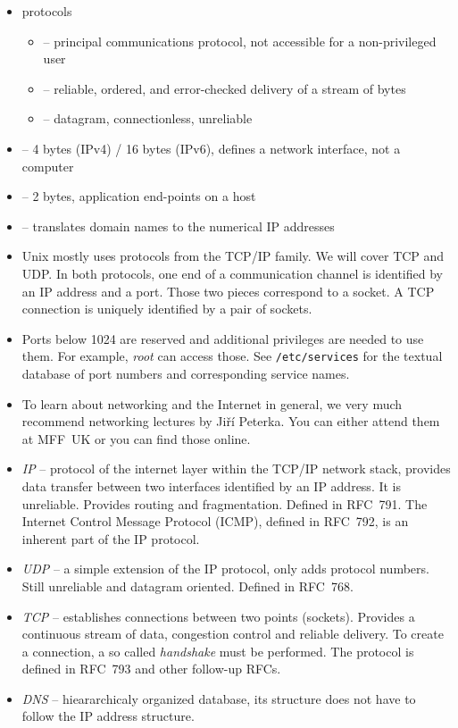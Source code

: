 
\begin{slide}
\begin{itemize}
\item protocols
    \begin{itemize}
    \item {} -- principal communications protocol,
    not accessible for a non-privileged user
    \item {} -- reliable, ordered, and
    error-checked delivery of a stream of bytes
    \item {} -- datagram, connectionless,
    unreliable
    \end{itemize}
\item {} -- 4 bytes (IPv4) / 16 bytes (IPv6), defines a network
interface, not a computer
\item {} -- 2 bytes, application end-points on a host
\item {} --  translates domain names to the
numerical IP addresses 
\end{itemize}
\end{slide}

\begin{itemize}
\item Unix mostly uses protocols from the TCP/IP family.  We will cover TCP and
UDP.  In both protocols, one end of a communication channel is identified by an
IP address and a port.  Those two pieces correspond to a socket.  A TCP
connection is uniquely identified by a pair of sockets.
\item Ports below 1024 are reserved and additional privileges are needed to use
them.  For example, \emph{root} can access those.  See \texttt{/etc/services}
for the textual database of port numbers and corresponding service names.
\item To learn about networking and the Internet in general, we very much
recommend networking lectures by Ji\v{r}\'{i} Peterka.  You can either
attend them at MFF~UK or you can find those online.
\item \emph{IP} -- protocol of the internet layer within the TCP/IP network
stack, provides data transfer between two interfaces identified by an IP
address.  It is unreliable.  Provides routing and fragmentation.  Defined in
RFC~791.  The Internet Control Message Protocol (ICMP), defined in RFC~792, is
an inherent part of the IP protocol.
\item \emph{UDP} -- a simple extension of the IP protocol, only adds protocol
numbers.  Still unreliable and datagram oriented.  Defined in RFC~768.
\item \emph{TCP} -- establishes connections between two points (sockets).
Provides a continuous stream of data, congestion control and reliable
delivery.  To create a connection, a so called \emph{handshake} must be
performed.  The protocol is defined in RFC~793 and other follow-up RFCs.
\item \emph{DNS} -- hieararchicaly organized database, its structure does not
have to follow the IP address structure.
\end{itemize}

